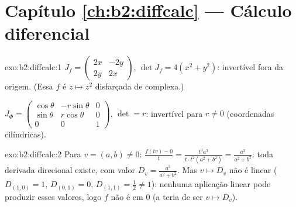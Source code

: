 \section*{Capítulo \ref{ch:b2:diffcalc} --- Cálculo diferencial}

\begin{solution}{exo:b2:diffcalc:1}
$J_f = \begin{pmatrix} 2x & -2y\\ 2y & 2x\end{pmatrix}$, $\det J_f
= 4(x^2 + y^2)$: invertível fora da origem. (Essa $f$ é $z
\mapsto z^2$ disfarçada de complexa.)

$J_\Phi = \begin{pmatrix} \cos\theta & -r\sin\theta & 0\\
\sin\theta & r\cos\theta & 0\\ 0 & 0 & 1\end{pmatrix}$, $\det = r$:
invertível para $r \neq 0$ (coordenadas cilíndricas).
\end{solution}

\begin{solution}{exo:b2:diffcalc:2}
Para $v = (a, b) \neq 0$: $\frac{f(tv) - 0}{t} = \frac{t^3a^3}{t\cdot
t^2(a^2+b^2)} = \frac{a^3}{a^2 + b^2}$: toda derivada
direcional existe, com valor $D_v = \frac{a^3}{a^2+b^2}$. Mas $v
\mapsto D_v$ não é linear ($D_{(1,0)} = 1$, $D_{(0,1)} = 0$,
$D_{(1,1)} = \frac12 \neq 1$): nenhuma aplicação linear pode produzir esses
valores, logo $f$ não é  em $0$ (a  teria
de ser $v \mapsto D_v$).
\end{solution}

